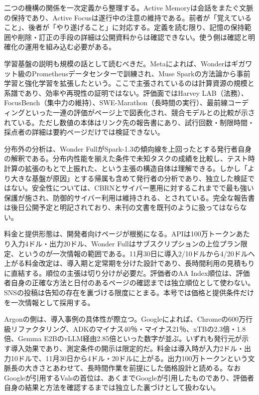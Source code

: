 \documentclass[lualatex,a4paper,10pt]{jlreq}
\begin{document}
二つの機構の関係を一次定義から整理する。Active Memoryは会話をまたぐ文脈の保持であり、Active Focusは遂行中の注意の維持である。前者が「覚えていること」、後者が「やり遂げること」に対応する。定義を読む限り、記憶の保持範囲や削除・訂正の手段の詳細は公開資料からは確認できない。使う側は確認と明確化の運用を組み込む必要がある。
\cite{B01,B02,B03}


学習基盤の説明も規模の話として読むべきだ。Metaによれば、Wonderはギガワット級のPrometheusデータセンターで訓練され、Muse Sparkの方法論から事前学習と強化学習を拡張したという。ここで主張されているのは計算資源の規模と系譜であり、効率や再現性の証明ではない。評価面ではHarvey LAB（法務）、FocusBench（集中力の維持）、SWE-Marathon（長時間の実行）、最前線コーディングといった一連の評価がページ上で図表化され、競合モデルとの比較が示されている。ただし数値の本体はリンク先の報告書にあり、試行回数・制限時間・採点者の詳細は要約ページだけでは検証できない。
\cite{B01,B02,B03}


分布外の分析は、Wonder FullがSpark-1.3の傾向線を上回ったとする発行者自身の解釈である。分布内性能を揃えた条件で未知タスクの成績を比較し、テスト時計算の拡張のもとで上振れた、という主張の構造自体は理解できる。しかし「より大きな基盤が原因」とする帰属も含めて発行者の分析であり、独立した検証ではない。安全性については、CBRNとサイバー悪用に対するこれまでで最も強い保護が施され、防御的サイバー利用は維持される、とされている。完全な報告書は後日公開予定と明記されており、未刊の文書を既刊のように扱ってはならない。
\cite{B01,B02,B03}


料金と提供形態は、開発者向けページが根拠になる。APIは100万トークンあたり入力4ドル・出力20ドル、Wonder Fullはサブスクリプションの上位プラン限定、というのが一次情報の範囲である。11月30日に導入2/10ドルから4/20ドルへ上がる料金改定は、導入期と定常期を分けた設計であり、長時間利用の見積もりに直結する。順位の主張は切り分けが必要だ。評価者のAA Index順位は、評価者自身の正確な方法と日付のあるページの確認までは独立順位として使わない。SNSの投稿は告知の存在を裏づける限度にとまる。本号では価格と提供条件だけを一次情報として採用する。
\cite{B01,B04,B05,B02,B06,B07,B03,B08}


Argonの側は、導入事例の具体性が際立つ。Googleによれば、Chromeの600万行級リファクタリング、ADKのマイナス40％・マイナス21％、xTBの2.3倍・1.8倍、Gemma E2BのvLLM経由2.85倍といった数字が並ぶ。いずれも発行元が示す導入効果であり、測定条件の開示は限定的だ。料金は導入時が入力2ドル・出力10ドルで、11月30日から4ドル・20ドルに上がる。出力100万トークンという文脈長の大きさとあわせて、長時間作業を前提にした価格設計と読める。なおGoogleが引用するValsの首位は、あくまでGoogleが引用したものであり、評価者自身の結果と方法を確認するまでは独立した裏づけとして扱わない。
\cite{B04,B05,B06,B07,B08}
\end{document}
